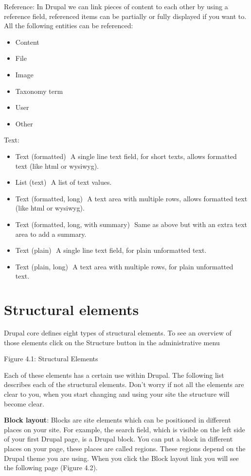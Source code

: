Reference: 
In Drupal we can link pieces of content to each other by using a reference field, referenced items can be partially or fully displayed if you want to. All the following entities can be referenced: 
\begin{itemize}  
    \item Content 
    \item File 
    \item Image 
    \item Taxonomy term 
    \item User 
    \item Other 
\end{itemize}

Text:
\begin{itemize}
    \item Text (formatted) ­ A single line text field, for short texts, allows formatted text (like html or wysiwyg). 
    \item List (text) ­ A list of text values. 
    \item Text (formatted, long) ­ A text area with multiple rows, allows formatted text (like html or wysiwyg). 
    \item Text (formatted, long, with summary) ­ Same as above but with an extra text area to add a summary. 
    \item Text (plain) ­ A single line text field, for plain unformatted text. 
    \item Text (plain, long) ­ A text area with multiple rows, for plain unformatted text. 
\end{itemize}


\section{Structural elements}
Drupal core defines eight types of structural elements. To see an overview of those elements click on the Structure button in the administrative menu

Figure 4.1: Structural Elements

Each of these elements has a certain use within Drupal. The following list describes each of the structural elements. Don’t worry if not all the elements are clear to you, when you start changing and using your site the structure will become clear.

\textbf{Block layout}: Blocks are site elements which can be positioned in different places on your site. For example, the search field, which is visible on the left side of your first Drupal page, is a Drupal block. You can put a block in different places on your page, these places are called regions. These regions depend on the Drupal theme you are using. When you click the Block layout link you will see the following page (Figure 4.2).

